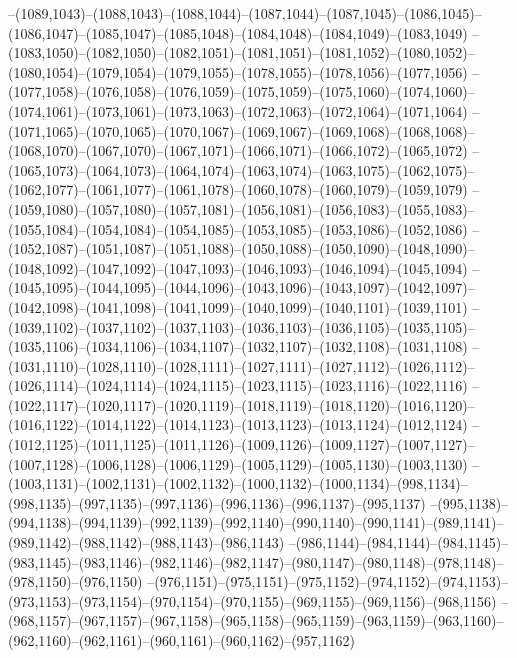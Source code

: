 --(1089,1043)--(1088,1043)--(1088,1044)--(1087,1044)--(1087,1045)--(1086,1045)--(1086,1047)--(1085,1047)--(1085,1048)--(1084,1048)--(1084,1049)--(1083,1049)
--(1083,1050)--(1082,1050)--(1082,1051)--(1081,1051)--(1081,1052)--(1080,1052)--(1080,1054)--(1079,1054)--(1079,1055)--(1078,1055)--(1078,1056)--(1077,1056)
--(1077,1058)--(1076,1058)--(1076,1059)--(1075,1059)--(1075,1060)--(1074,1060)--(1074,1061)--(1073,1061)--(1073,1063)--(1072,1063)--(1072,1064)--(1071,1064)
--(1071,1065)--(1070,1065)--(1070,1067)--(1069,1067)--(1069,1068)--(1068,1068)--(1068,1070)--(1067,1070)--(1067,1071)--(1066,1071)--(1066,1072)--(1065,1072)
--(1065,1073)--(1064,1073)--(1064,1074)--(1063,1074)--(1063,1075)--(1062,1075)--(1062,1077)--(1061,1077)--(1061,1078)--(1060,1078)--(1060,1079)--(1059,1079)
--(1059,1080)--(1057,1080)--(1057,1081)--(1056,1081)--(1056,1083)--(1055,1083)--(1055,1084)--(1054,1084)--(1054,1085)--(1053,1085)--(1053,1086)--(1052,1086)
--(1052,1087)--(1051,1087)--(1051,1088)--(1050,1088)--(1050,1090)--(1048,1090)--(1048,1092)--(1047,1092)--(1047,1093)--(1046,1093)--(1046,1094)--(1045,1094)
--(1045,1095)--(1044,1095)--(1044,1096)--(1043,1096)--(1043,1097)--(1042,1097)--(1042,1098)--(1041,1098)--(1041,1099)--(1040,1099)--(1040,1101)--(1039,1101)
--(1039,1102)--(1037,1102)--(1037,1103)--(1036,1103)--(1036,1105)--(1035,1105)--(1035,1106)--(1034,1106)--(1034,1107)--(1032,1107)--(1032,1108)--(1031,1108)
--(1031,1110)--(1028,1110)--(1028,1111)--(1027,1111)--(1027,1112)--(1026,1112)--(1026,1114)--(1024,1114)--(1024,1115)--(1023,1115)--(1023,1116)--(1022,1116)
--(1022,1117)--(1020,1117)--(1020,1119)--(1018,1119)--(1018,1120)--(1016,1120)--(1016,1122)--(1014,1122)--(1014,1123)--(1013,1123)--(1013,1124)--(1012,1124)
--(1012,1125)--(1011,1125)--(1011,1126)--(1009,1126)--(1009,1127)--(1007,1127)--(1007,1128)--(1006,1128)--(1006,1129)--(1005,1129)--(1005,1130)--(1003,1130)
--(1003,1131)--(1002,1131)--(1002,1132)--(1000,1132)--(1000,1134)--(998,1134)--(998,1135)--(997,1135)--(997,1136)--(996,1136)--(996,1137)--(995,1137)
--(995,1138)--(994,1138)--(994,1139)--(992,1139)--(992,1140)--(990,1140)--(990,1141)--(989,1141)--(989,1142)--(988,1142)--(988,1143)--(986,1143)
--(986,1144)--(984,1144)--(984,1145)--(983,1145)--(983,1146)--(982,1146)--(982,1147)--(980,1147)--(980,1148)--(978,1148)--(978,1150)--(976,1150)
--(976,1151)--(975,1151)--(975,1152)--(974,1152)--(974,1153)--(973,1153)--(973,1154)--(970,1154)--(970,1155)--(969,1155)--(969,1156)--(968,1156)
--(968,1157)--(967,1157)--(967,1158)--(965,1158)--(965,1159)--(963,1159)--(963,1160)--(962,1160)--(962,1161)--(960,1161)--(960,1162)--(957,1162)
